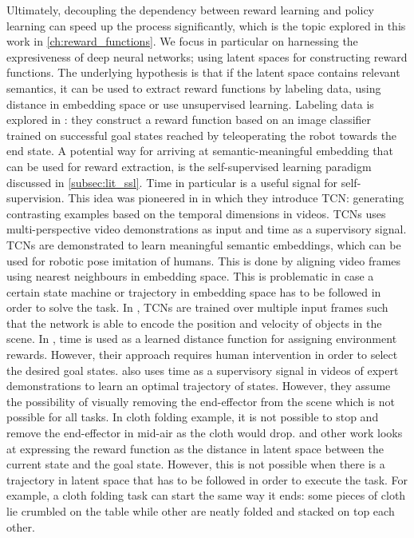 \documentclass[\home/main.tex]{subfiles}
\begin{document}
Ultimately, decoupling the dependency between reward learning and policy learning can speed up the process significantly, which is the topic explored in this work in \cref{ch:reward_functions}. We focus in particular on harnessing the expresiveness of deep neural networks; using latent spaces for constructing reward functions. The underlying hypothesis is that if the latent space contains relevant semantics, it can be used to extract reward functions by labeling data, using distance in embedding space or use unsupervised learning. Labeling data is explored in \autocite{Singh2019}: they construct a reward function based on an image classifier trained on successful goal states reached by teleoperating the robot towards the end state. A potential way for arriving at semantic-meaningful embedding that can be used for reward extraction, is the self-supervised learning paradigm discussed in \cref{subsec:lit_ssl}. Time in particular is a useful signal for self-supervision. This idea was pioneered in \autocite{Sermanet2017TCN} in which they introduce \gls{TCN}: generating contrasting examples based on the temporal dimensions in videos. \glspl{TCN} uses multi-perspective video demonstrations as input and time as a supervisory signal. \Glspl{TCN} are demonstrated to learn meaningful semantic embeddings, which can be used for robotic pose imitation of humans. This is done by aligning video frames using nearest neighbours in embedding space. This is problematic in case a certain state machine or trajectory in embedding space has to be followed in order to solve the task. In \autocite{Dwibedi2018mfTCN}, TCNs are trained over multiple input frames such that the network is able to encode the position and velocity of objects in the scene. In \autocite{Hartikainen2019}, time is used as a learned distance function for assigning environment rewards. However, their approach requires human intervention in order to select the desired goal states.  \autocite{Nair2018time} also uses time as a supervisory signal in videos of expert demonstrations to learn an optimal trajectory of states. However, they assume the possibility of visually removing the end-effector from the scene which is not possible for all tasks. In cloth folding example, it is not possible to stop and remove the end-effector in mid-air as the cloth would drop.
\autocite{Sermanet2017TCN} and other work \autocite{Nair2018visual} looks at expressing the reward function as the distance in latent space between the current state and the goal state. However, this is not possible when there is a trajectory in latent space that has to be followed in order to execute the task. For example, a cloth folding task can start the same way it ends: some pieces of cloth lie crumbled on the table while other are neatly folded and stacked on top each other.   
\end{document}
